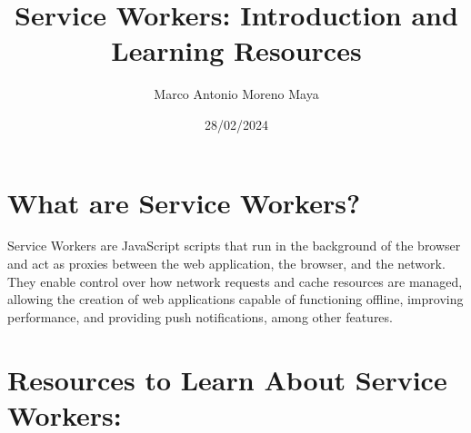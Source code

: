 \documentclass{article}
\begin{document}
\title{Service Workers: Introduction and Learning Resources}
\author{Marco Antonio Moreno Maya}
\date{28/02/2024}
\maketitle

\section*{What are Service Workers?}

Service Workers are JavaScript scripts that run in the background of the browser and act as proxies between the web application, the browser, and the network. They enable control over how network requests and cache resources are managed, allowing the creation of web applications capable of functioning offline, improving performance, and providing push notifications, among other features.

\section*{Resources to Learn About Service Workers:}

  
  
  
  
\end{document}
